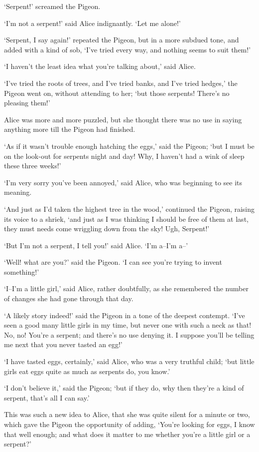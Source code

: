 \documentclass[statementpaper,twoside,openany]{memoir}
\begin{document}
`Serpent!' screamed the Pigeon.

`I'm not a serpent!' said Alice indignantly. `Let me alone!'

`Serpent, I say again!' repeated the Pigeon, but in a more subdued tone, and added with a kind of sob, `I've tried every way, and nothing seems to suit them!'

`I haven't the least idea what you're talking about,' said Alice.

`I've tried the roots of trees, and I've tried banks, and I've tried hedges,' the Pigeon went on, without attending to her; `but those serpents! There's no pleasing them!'

Alice was more and more puzzled, but she thought there was no use in saying anything more till the Pigeon had finished.

`As if it wasn't trouble enough hatching the eggs,' said the Pigeon; `but I must be on the look-out for serpents night and day! Why, I haven't had a wink of sleep these three weeks!'

`I'm very sorry you've been annoyed,' said Alice, who was beginning to see its meaning.

`And just as I'd taken the highest tree in the wood,' continued the Pigeon, raising its voice to a shriek, `and just as I was thinking I should be free of them at last, they must needs come wriggling down from the sky! Ugh, Serpent!'

`But I'm not a serpent, I tell you!' said Alice. `I'm a--I'm a--'

`Well! what are you?' said the Pigeon. `I can see you're trying to invent something!'

`I--I'm a little girl,' said Alice, rather doubtfully, as she remembered the number of changes she had gone through that day.

`A likely story indeed!' said the Pigeon in a tone of the deepest contempt. `I've seen a good many little girls in my time, but never one with such a neck as that! No, no! You're a serpent; and there's no use denying it. I suppose you'll be telling me next that you never tasted an egg!'

`I have tasted eggs, certainly,' said Alice, who was a very truthful child; `but little girls eat eggs quite as much as serpents do, you know.'

`I don't believe it,' said the Pigeon; `but if they do, why then they're a kind of serpent, that's all I can say.'

This was such a new idea to Alice, that she was quite silent for a minute or two, which gave the Pigeon the opportunity of adding, `You're looking for eggs, I know that well enough; and what does it matter to me whether you're a little girl or a serpent?'
\end{document}
